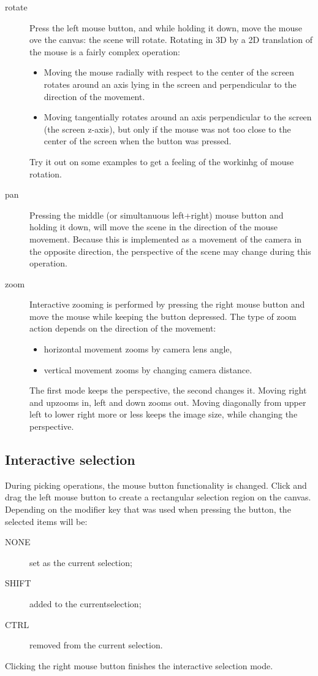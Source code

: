\begin{description}
\item[rotate] Press the left mouse button, and while holding it down, move the mouse ove the canvas: the scene will rotate. Rotating in 3D by a 2D translation of the mouse is a fairly complex operation:
\begin{itemize}
\item Moving the mouse radially with respect to the center of the screen rotates around an axis lying in the screen and perpendicular to the direction of the movement.
\item Moving tangentially rotates around an axis perpendicular to the screen (the screen z-axis), but only if the mouse was not too close to the center of the screen when the button was pressed.
\end{itemize}
Try it out on some examples to get a feeling of the workinhg of mouse rotation.

\item[pan] Pressing the middle (or simultanuous left+right) mouse button and holding it down, will move the scene in the direction of the mouse movement. Because this is implemented as a movement of the camera in the opposite direction, the perspective of the scene may change during this operation.
\item[zoom] Interactive zooming is performed by pressing the right mouse button and move the mouse while keeping the button depressed. The type of zoom action depends on the direction of the movement:
\begin{itemize}
\item horizontal movement zooms by camera lens angle,
\item vertical movement zooms by changing camera distance.
\end{itemize}
The first mode keeps the perspective, the second changes it. Moving right and upzooms in, left and down zooms out. Moving diagonally from upper left to lower right more or less keeps the image size, while changing the perspective.

\end{description}

\subsection{Interactive selection}
During picking operations, the mouse button functionality is changed. Click and drag the left mouse button to create a rectangular selection region on the canvas. Depending on the modifier key that was used when pressing the button, the selected items will be:
\begin{description}
\item[NONE] set as the current selection;
\item[SHIFT] added to the currentselection;
\item[CTRL] removed from the current selection.
\end{description}
Clicking the right mouse button finishes the interactive selection mode.

